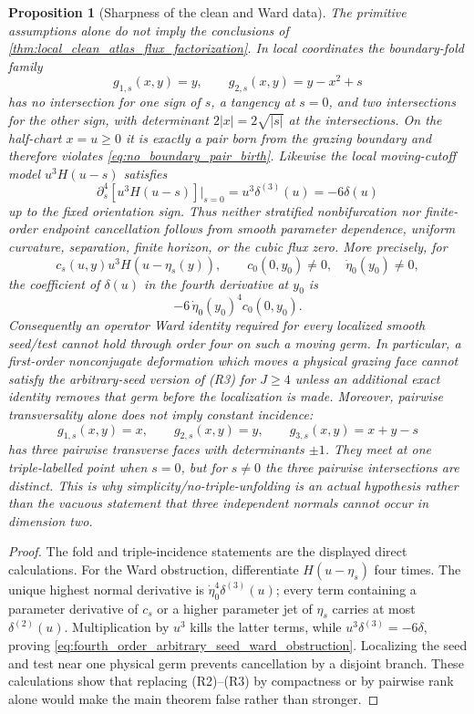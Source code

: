 \documentclass[11pt]{amsart}
\theoremstyle{compactplain}
\newtheorem{proposition}[theorem]{Proposition}
\theoremstyle{compactdefinition}
\theoremstyle{compactremark}
\begin{document}
\begin{proposition}[Sharpness of the clean and Ward data]
\label{prop:sharpness_clean_ward_data}
The primitive assumptions alone do not imply the conclusions of
\cref{thm:local_clean_atlas_flux_factorization}.  In local coordinates the
  boundary-fold family
\[
  g_{1,s}(x,y)=y,\qquad g_{2,s}(x,y)=y-x^2+s
\]
  has no intersection for one sign of \(s\), a tangency at \(s=0\), and two
  intersections for the other sign, with determinant \(2|x|=2\sqrt{|s|}\) at
  the intersections.  On the half-chart \(x=u\ge0\) it is exactly a pair born
  from the grazing boundary and therefore violates
  \eqref{eq:no_boundary_pair_birth}.  Likewise the local moving-cutoff model
\(u^3H(u-s)\) satisfies
\[
  \partial_s^4[u^3H(u-s)]|_{s=0}=u^3\delta^{(3)}(u)=-6\delta(u)
\]
up to the fixed orientation sign.  Thus neither stratified nonbifurcation nor
finite-order endpoint cancellation follows from smooth parameter dependence,
uniform curvature, separation, finite horizon, or the cubic flux zero.
More precisely, for
\[
 c_s(u,y)u^3H(u-\eta_s(y)),\qquad
 c_0(0,y_0)\ne0,\quad\dot\eta_0(y_0)\ne0,
\]
the coefficient of \(\delta(u)\) in the fourth derivative at \(y_0\) is
\begin{equation}
\label{eq:fourth_order_arbitrary_seed_ward_obstruction}
 -6\,\dot\eta_0(y_0)^4c_0(0,y_0).
\end{equation}
Consequently an operator Ward identity required for every localized smooth
seed/test cannot hold through order four on such a moving germ.  In
particular, a first-order nonconjugate deformation which moves a physical
grazing face cannot satisfy the arbitrary-seed version of (R3) for
\(J\ge4\) unless an additional exact identity removes that germ before the
localization is made.
Moreover, pairwise transversality alone does not imply constant incidence:
\[
 g_{1,s}(x,y)=x,\qquad g_{2,s}(x,y)=y,\qquad
 g_{3,s}(x,y)=x+y-s
\]
has three pairwise transverse faces with determinants \(\pm1\).  They meet at
one triple-labelled point when \(s=0\), but for \(s\ne0\) the three pairwise
intersections are distinct.  This is why simplicity/no-triple-unfolding is an
actual hypothesis rather than the vacuous statement that three independent
normals cannot occur in dimension two.
\end{proposition}

\begin{proof}
The fold and triple-incidence statements are the displayed direct
calculations.  For the Ward obstruction, differentiate
\(H(u-\eta_s)\) four times.  The unique highest normal derivative is
\(\dot\eta_0^4\delta^{(3)}(u)\); every term containing a parameter derivative
of \(c_s\) or a higher parameter jet of \(\eta_s\) carries at most
\(\delta^{(2)}(u)\).  Multiplication by \(u^3\) kills the latter terms, while
\(u^3\delta^{(3)}=-6\delta\), proving
\eqref{eq:fourth_order_arbitrary_seed_ward_obstruction}.  Localizing the seed
and test near one physical germ prevents cancellation by a disjoint branch.
These calculations
show that replacing (R2)--(R3) by compactness or by pairwise rank alone would
make the main theorem false rather than stronger.
\end{proof}
\end{document}
